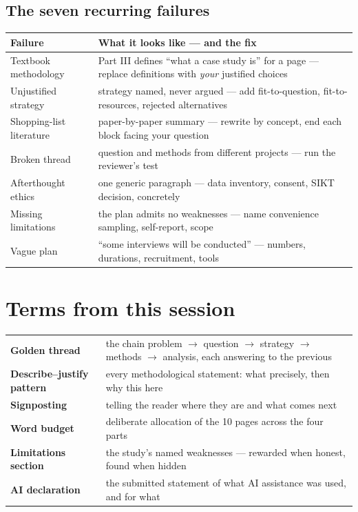 \documentclass[11pt,a4paper,british,twoside=false,headings=small,chapterprefix=false,numbers=noenddot]{scrbook}
\begin{document}
\subsection{The seven recurring failures}
\begin{center}\small
\footnotesize
  \renewcommand{\arraystretch}{1.28}
  \begin{tabular}{@{}p{4.6cm}p{8.7cm}@{}}
    \toprule
    \textbf{Failure} & \textbf{What it looks like --- and the fix}\\
    \midrule
    Textbook methodology & Part III defines ``what a case study is'' for a page --- replace definitions with \emph{your} justified choices\\
    Unjustified strategy & strategy named, never argued --- add fit-to-question, fit-to-resources, rejected alternatives\\
    Shopping-list literature & paper-by-paper summary --- rewrite by concept, end each block facing your question\\
    Broken thread & question and methods from different projects --- run the reviewer's test\\
    Afterthought ethics & one generic paragraph --- data inventory, consent, SIKT decision, concretely\\
    Missing limitations & the plan admits no weaknesses --- name convenience sampling, self-report, scope\\
    Vague plan & ``some interviews will be conducted'' --- numbers, durations, recruitment, tools\\
    \bottomrule
  \end{tabular}
\end{center}


\section*{Terms from this session}
\begin{center}\small
\footnotesize
  \renewcommand{\arraystretch}{1.25}
  \begin{tabular}{@{}p{3.8cm}p{9.7cm}@{}}
    \toprule
    \textbf{Golden thread} & the chain problem $\rightarrow$ question $\rightarrow$ strategy $\rightarrow$ methods $\rightarrow$ analysis, each answering to the previous\\
    \textbf{Describe--justify pattern} & every methodological statement: what precisely, then why this here\\
    \textbf{Signposting} & telling the reader where they are and what comes next\\
    \textbf{Word budget} & deliberate allocation of the 10 pages across the four parts\\
    \textbf{Limitations section} & the study's named weaknesses --- rewarded when honest, found when hidden\\
    \textbf{AI declaration} & the submitted statement of what AI assistance was used, and for what\\
    \bottomrule
  \end{tabular}
\end{center}
\end{document}
